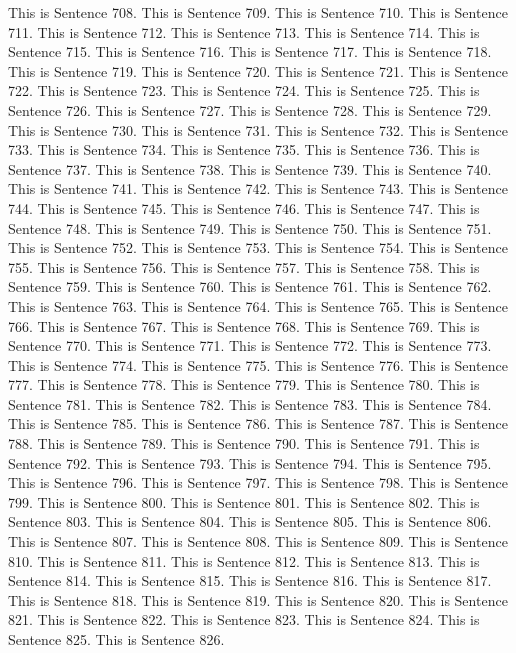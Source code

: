 \documentclass{article}
\begin{document}
This is Sentence 708.
This is Sentence 709.
This is Sentence 710.
This is Sentence 711.
This is Sentence 712.
This is Sentence 713.
This is Sentence 714.
This is Sentence 715.
This is Sentence 716.
This is Sentence 717.
This is Sentence 718.
This is Sentence 719.
This is Sentence 720.
This is Sentence 721.
This is Sentence 722.
This is Sentence 723.
This is Sentence 724.
This is Sentence 725.
This is Sentence 726.
This is Sentence 727.
This is Sentence 728.
This is Sentence 729.
This is Sentence 730.
This is Sentence 731.
This is Sentence 732.
This is Sentence 733.
This is Sentence 734.
This is Sentence 735.
This is Sentence 736.
This is Sentence 737.
This is Sentence 738.
This is Sentence 739.
This is Sentence 740.
This is Sentence 741.
This is Sentence 742.
This is Sentence 743.
This is Sentence 744.
This is Sentence 745.
This is Sentence 746.
This is Sentence 747.
This is Sentence 748.
This is Sentence 749.
This is Sentence 750.
This is Sentence 751.
This is Sentence 752.
This is Sentence 753.
This is Sentence 754.
This is Sentence 755.
This is Sentence 756.
This is Sentence 757.
This is Sentence 758.
This is Sentence 759.
This is Sentence 760.
This is Sentence 761.
This is Sentence 762.
This is Sentence 763.
This is Sentence 764.
This is Sentence 765.
This is Sentence 766.
This is Sentence 767.
This is Sentence 768.
This is Sentence 769.
This is Sentence 770.
This is Sentence 771.
This is Sentence 772.
This is Sentence 773.
This is Sentence 774.
This is Sentence 775.
This is Sentence 776.
This is Sentence 777.
This is Sentence 778.
This is Sentence 779.
This is Sentence 780.
This is Sentence 781.
This is Sentence 782.
This is Sentence 783.
This is Sentence 784.
This is Sentence 785.
This is Sentence 786.
This is Sentence 787.
This is Sentence 788.
This is Sentence 789.
This is Sentence 790.
This is Sentence 791.
This is Sentence 792.
This is Sentence 793.
This is Sentence 794.
This is Sentence 795.
This is Sentence 796.
This is Sentence 797.
This is Sentence 798.
This is Sentence 799.
This is Sentence 800.
This is Sentence 801.
This is Sentence 802.
This is Sentence 803.
This is Sentence 804.
This is Sentence 805.
This is Sentence 806.
This is Sentence 807.
This is Sentence 808.
This is Sentence 809.
This is Sentence 810.
This is Sentence 811.
This is Sentence 812.
This is Sentence 813.
This is Sentence 814.
This is Sentence 815.
This is Sentence 816.
This is Sentence 817.
This is Sentence 818.
This is Sentence 819.
This is Sentence 820.
This is Sentence 821.
This is Sentence 822.
This is Sentence 823.
This is Sentence 824.
This is Sentence 825.
This is Sentence 826.
\end{document}
